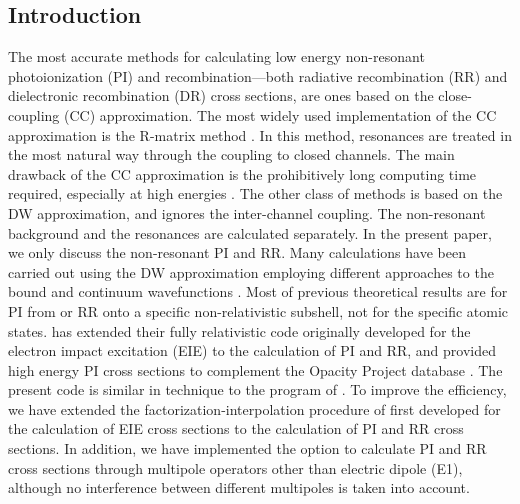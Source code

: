 \subsection{Introduction}
The most accurate methods for calculating low energy
non-resonant photoionization (PI) and
recombination---both radiative recombination (RR) and dielectronic
recombination (DR) cross sections, are ones
based on the close-coupling (CC) approximation. The most widely used
implementation of the CC approximation is the 
R-matrix method \cite{hummer93, berrington95}. In this method, resonances are
treated in the most natural way through the coupling to closed channels. The
main drawback of the CC approximation is the prohibitively long computing time
required, especially at high energies \cite{zhang98}. The other class of
methods is based on the DW approximation, and ignores the inter-channel
coupling. The non-resonant background and the resonances are calculated
separately. In the present paper, we only discuss the non-resonant
PI and RR. Many calculations have been carried out using the DW approximation
employing different approaches to the bound and continuum wavefunctions
\cite{reilman79, clark86, verner93}. Most of previous theoretical results are
for PI from or RR onto a specific non-relativistic subshell, not for the
specific atomic states. \citet{zhang98} has extended their fully
relativistic code originally developed for the electron impact excitation
(EIE) to the 
calculation of PI and RR, and provided high energy PI cross sections to
complement the Opacity Project database \cite{seaton87}. The
present code is similar in technique to the program of \citet{zhang98}. To
improve the efficiency, we have extended the factorization-interpolation
procedure of \citet{barshalom:1988a} first developed for the calculation of EIE
cross sections to the calculation of PI and RR cross sections. 
In addition, we have implemented the option to calculate PI and RR cross
sections through multipole operators other than electric dipole (E1), although
no interference between different multipoles is taken into account. 

